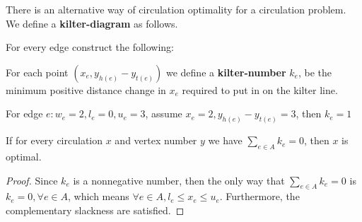 			There is an alternative way of circulation optimality for a circulation problem. We define a \textbf{kilter-diagram} as follows.

			For every edge construct the following:
			\begin{figure}[!ht]
				\centering
			\end{figure}

			For each point $(x_e, y_{h(e)} - y_{t(e)})$ we define a \textbf{kilter-number} $k_e$, be the minimum positive distance change in $x_e$ required to put in on the kilter line.
			\begin{example}
				For edge $e: w_e = 2, l_e = 0, u_e = 3$, assume $x_e = 2, y_{h(e)} - y_{t(e)} = 3$, then $k_e = 1$
			\end{example}

			\begin{figure}[!ht]
				\centering
			\end{figure}

			\begin{lemma}
				If for every circulation $x$ and vertex number $y$ we have $\sum_{e \in A} k_e = 0$, then $x$ is optimal.
			\end{lemma}

			\begin{proof}
				Since $k_e$ is a nonnegative number, then the only way that $\sum_{e \in A} k_e = 0$ is $k_e = 0, \forall e\in A$, which means $\forall e\in A, l_e \le x_e \le u_e$. Furthermore, the complementary slackness are satisfied.
			\end{proof}

